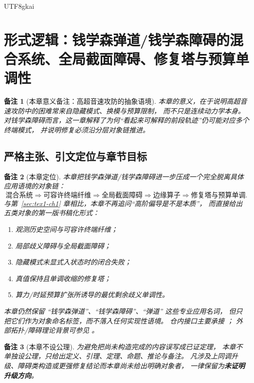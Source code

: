 \documentclass[12pt]{article}
\newtheorem{remark}{备注}[section]
\begin{document}
\begin{CJK*}{UTF8}{gkai}
\clearpage

\clearpage
\section{形式逻辑：钱学森弹道/钱学森障碍的混合系统、全局截面障碍、修复塔与预算单调性}
\label{sec:tex1-ch2}

\begin{remark}[本章意义备注：高超音速攻防的抽象语境]
本章的意义，在于说明高超音速攻防中的困难常来自隐藏模式、换模与预算限制，
而不只是连续动力学本身。
对钱学森障碍而言，这一章解释了为何“看起来可解释的前段轨迹”仍可能对应多个终端模式，
并说明修复必须沿分层对象链推进。
\end{remark}

\subsection{严格主张、引文定位与章节目标}
\label{subsec:tex1-ch2-claim}

\begin{remark}[本章定位]
本章把钱学森弹道/钱学森障碍进一步压成一个完全脱离具体应用语境的对象链：
\[
  \text{混合系统}
  \Longrightarrow
  \text{可容许终端纤维}
  \Longrightarrow
  \text{全局截面障碍}
  \Longrightarrow
  \text{边缘算子}
  \Longrightarrow
  \text{修复塔与预算单调}.
\]
与第~\ref{sec:tex1-ch1} 章相比，本章不再追问“高阶偏导是不是本质”，
而直接给出五类对象的第一版书稿化形式：
\begin{enumerate}
  \item 观测历史空间与可容许终端纤维；
  \item 局部歧义障碍与全局截面障碍；
  \item 隐藏模式未显式入状态时的闭合失败；
  \item 真值保持且单调收缩的修复塔；
  \item 算力/时延预算扩张所诱导的最优剩余歧义单调性。
\end{enumerate}
本章仍然保留 ``钱学森弹道''、``钱学森障碍''、``弹道'' 这些专业应用名词，
但只把它们作为对象命名标签，而不落入任何实现性语境。
仓内接口主要承接 \cite{RepoTex29RepairableObstruction,RepoTex32FiberSectionHole,RepoTex38JacobiBianchiRepair,
  RepoTex17EdgeOperator,RepoTex18HomotopyAxiom}；
外部拓扑/障碍理论背景可参见 \cite{Husemoller1994FibreBundles,Hatcher2002AT}。
\end{remark}

\begin{remark}[本章不设公理]
为避免把尚未构造完成的内容误写成已证定理，
本章不单独设公理，只给出定义、引理、定理、命题、推论与备注。
凡涉及上同调升级、障碍类构造或更强修复结论而本章尚未给出明确对象者，
一律保留为\textbf{未证明升级方向}。
\end{remark}


\end{CJK*}
\end{document}
